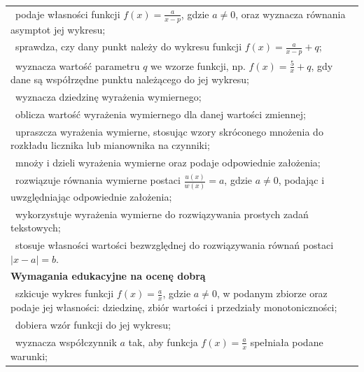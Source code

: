 \documentclass[12pt,a4paper]{article}
\begin{document}
\begin{longtable}{|p{16cm}|}
		\textbullet\ podaje własności funkcji $f(x)=\frac{a}{x-p}$, gdzie $a\neq 0$, oraz wyznacza równania asymptot jej wykresu; \\
		
		\textbullet\ sprawdza, czy dany punkt należy do wykresu funkcji $f(x)=\frac{a}{x-p}+q$; \\
		
		\textbullet\ wyznacza wartość parametru $q$ we wzorze funkcji, np. $f(x)=\frac{5}{x}+q$, gdy dane są współrzędne punktu należącego do jej wykresu; \\
		
		\textbullet\ wyznacza dziedzinę wyrażenia wymiernego; \\
		
		\textbullet\ oblicza wartość wyrażenia wymiernego dla danej wartości zmiennej; \\
		
		\textbullet\ upraszcza wyrażenia wymierne, stosując wzory skróconego mnożenia do rozkładu licznika lub mianownika na czynniki; \\
		
		\textbullet\ mnoży i dzieli wyrażenia wymierne oraz podaje odpowiednie założenia; \\
		
		\textbullet\ rozwiązuje równania wymierne postaci $\frac{u(x)}{w(x)}=a$, gdzie $a\neq 0$, podając i uwzględniając odpowiednie założenia; \\
		
		\textbullet\ wykorzystuje wyrażenia wymierne do rozwiązywania prostych zadań tekstowych; \\
		
		\textbullet\ stosuje własności wartości bezwzględnej do rozwiązywania równań postaci $|x-a|=b$. \\ \hline
		
		\textbf{Wymagania edukacyjne na ocenę dobrą} \\ \hline
		
		\textbullet\ szkicuje wykres funkcji $f(x)=\frac{a}{x}$, gdzie $a\neq 0$, w podanym zbiorze oraz podaje jej własności: dziedzinę, zbiór wartości i przedziały monotoniczności; \\
		
		\textbullet\ dobiera wzór funkcji do jej wykresu; \\
		
		\textbullet\ wyznacza współczynnik $a$ tak, aby funkcja $f(x)=\frac{a}{x}$ spełniała podane warunki; \\
		

\end{longtable}
\end{document}
